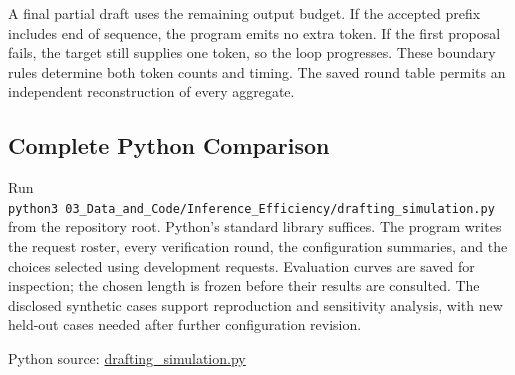 A final partial draft uses the remaining output budget. If the accepted
prefix includes end of sequence, the program emits no extra token. If
the first proposal fails, the target still supplies one token, so the
loop progresses. These boundary rules determine both token counts and
timing. The saved round table permits an independent reconstruction of
every aggregate.

\hypertarget{M07-complete-python-comparison}{%
\subsection{Complete Python
Comparison}\label{M07-complete-python-comparison}}

\noindent \noindent Run
\texttt{python3\ 03\_Data\_and\_Code/Inference\_Efficiency/drafting\_simulation.py}
from the repository root. Python's standard library suffices. The
program writes the request roster, every verification round, the
configuration summaries, and the choices selected using development
requests. Evaluation curves are saved for inspection; the chosen length
is frozen before their results are consulted. The disclosed synthetic
cases support reproduction and sensitivity analysis, with new held-out
cases needed after further configuration revision.

\FloatBarrier
{}
Python source:
\href{../03_Data_and_Code/Inference_Efficiency/drafting_simulation.py}{drafting\_simulation.py}


